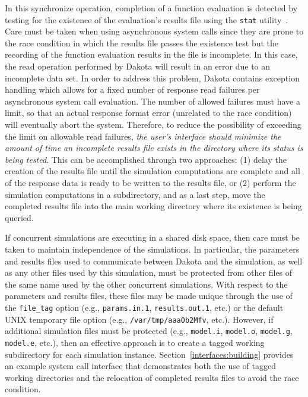 In this synchronize operation, completion of a function evaluation is
detected by testing for the existence of the evaluation's results file
using the \texttt{stat} utility~\cite{Ker88}. Care must be taken when
using asynchronous system calls since they are prone to the race
condition in which the results file passes the existence test but the
recording of the function evaluation results in the file is
incomplete. In this case, the read operation performed by Dakota will
result in an error due to an incomplete data set. In order to address
this problem, Dakota contains exception handling which allows for a
fixed number of response read failures per asynchronous system call
evaluation. The number of allowed failures must have a limit, so that
an actual response format error (unrelated to the race condition) will
eventually abort the system. Therefore, to reduce the possibility of
exceeding the limit on allowable read failures, \emph{the user's
interface should minimize the amount of time an incomplete results
file exists in the directory where its status is being tested}. This
can be accomplished through two approaches: (1) delay the creation of
the results file until the simulation computations are complete and
all of the response data is ready to be written to the results file,
or (2) perform the simulation computations in a subdirectory, and as a
last step, move the completed results file into the main working
directory where its existence is being queried.

If concurrent simulations are executing in a shared disk space, then
care must be taken to maintain independence of the simulations. In
particular, the parameters and results files used to communicate
between Dakota and the simulation, as well as any other files used by
this simulation, must be protected from other files of the same name
used by the other concurrent simulations. With respect to the
parameters and results files, these files may be made unique through
the use of the \texttt{file\_tag} option (e.g., \texttt{params.in.1},
\texttt{results.out.1}, etc.) or the default UNIX temporary file
option (e.g., \texttt{/var/tmp/aaa0b2Mfv}, etc.). However, if
additional simulation files must be protected (e.g., \texttt{model.i},
\texttt{model.o}, \texttt{model.g}, \texttt{model.e}, etc.), then an
effective approach is to create a tagged working subdirectory for each
simulation instance. Section~\ref{interfaces:building} provides an example
system call interface that demonstrates both the use of tagged working
directories and the relocation of completed results files to avoid the
race condition.

